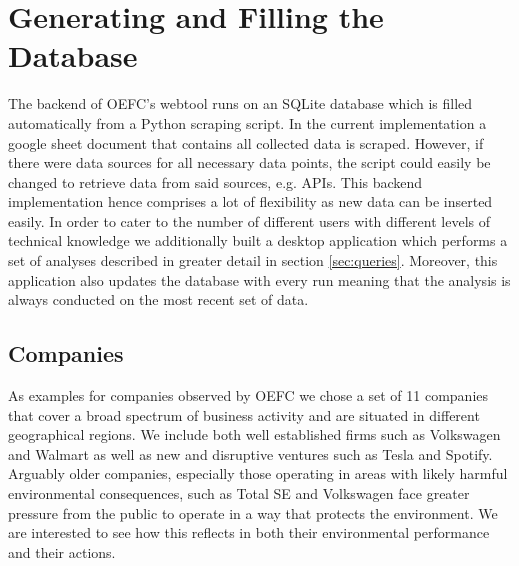 \section{Generating and Filling the Database}
The backend of OEFC's webtool runs on an SQLite database which is filled automatically from a Python scraping script.
In the current implementation a google sheet document that contains all collected data is scraped.
However, if there were data sources for all necessary data points, the script could easily be changed to retrieve data
from said sources, e.g. APIs.
This backend implementation hence comprises a lot of flexibility as new data can be inserted easily.
In order to cater to the number of different users with different levels of technical knowledge we additionally built a
desktop application which performs a set of analyses described in greater detail in section \ref{sec:queries}.
Moreover, this application also updates the database with every run meaning that the analysis is always conducted on the
most recent set of data.

\subsection{Companies}

As examples for companies observed by OEFC we chose a set of 11 companies that cover a broad spectrum of business activity
and are situated in different geographical regions.
We include both well established firms such as Volkswagen and Walmart as well as new and disruptive ventures such as Tesla
and Spotify.
Arguably older companies, especially those operating in areas with likely harmful environmental consequences, such as Total SE
and Volkswagen face greater pressure from the public to operate in a way that protects the environment.
We are interested to see how this reflects in both their environmental performance and their actions.

